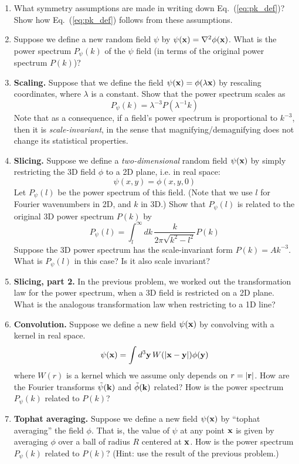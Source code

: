 \documentclass[aps,prd,superscriptaddress,groupedaddress,nofootinbib,nobibnotes]{revtex4}
\newcommand{\be}{\begin{equation}}
\newcommand{\ee}{\end{equation}}
\def\x{{\bf x}}
\def\y{{\bf y}}
\def\r{{\bf r}}
\def\k{{\bf k}}
\begin{document}
\begin{enumerate}

\item What symmetry assumptions are made in writing down Eq.~(\ref{eq:pk_def})?
 Show how Eq.~(\ref{eq:pk_def}) follows from these assumptions.

\item Suppose we define a new random field $\psi$ by $\psi(\x) = \nabla^2 \phi(\x)$.
What is the power spectrum $P_\psi(k)$ of the $\psi$ field (in terms of the original power spectrum $P(k)$)?

\item {\bf Scaling.}
Suppose that we define the field $\psi(\x) = \phi(\lambda\x)$ by rescaling coordinates,
where $\lambda$ is a constant.  Show that the power spectrum scales as
\be
P_\psi(k) = \lambda^{-3} P(\lambda^{-1} k)
\ee
Note that as a consequence, if a field's power spectrum is proportional to $k^{-3}$, 
then it is {\em scale-invariant}, in the sense that magnifying/demagnifying does 
not change its statistical properties.

\item {\bf Slicing.}
Suppose we define a {\em two-dimensional} random field $\psi(\x)$ by simply restricting 
the 3D field $\phi$ to a 2D plane, i.e. in real space:
\be
\psi(x,y) = \phi(x,y,0)
\ee
Let $P_\psi(l)$ be the power spectrum of this field.  (Note that we use $l$ for Fourier wavenumbers in 2D, and
$k$ in 3D.)  Show that $P_\psi(l)$ is related to the original 3D power spectrum $P(k)$ by
\be
P_\psi(l) = \int_l^\infty dk \, \frac{k}{2\pi\sqrt{k^2-l^2}} P(k)
\ee
Suppose the 3D power spectrum has the scale-invariant form $P(k) = A k^{-3}$.
What is $P_\psi(l)$ in this case?  Is it also scale invariant?

\item {\bf Slicing, part 2.}
In the previous problem, we worked out the transformation law for the power spectrum,
when a 3D field is restricted on a 2D plane.  What is the analogous transformation law
when restricting to a 1D line?

\item {\bf Convolution.}
Suppose we define a new field $\psi(\x)$ by convolving with a kernel in real space.
\be
\psi(\x) = \int d^3\y \, W(|\x-\y|) \phi(\y)
\ee
where $W(r)$ is a kernel which we assume only depends on $r = |\r|$.  How are the Fourier transforms $\tilde\psi(\k)$
and $\tilde\phi(\k)$ related?  How is the power spectrum $P_\psi(k)$ related to $P(k)$?

\item {\bf Tophat averaging.}
Suppose we define a new field $\psi(\x)$ by ``tophat averaging'' the field $\phi$.
That is, the value of $\psi$ at any point $\x$ is given by averaging $\phi$ over a ball of radius $R$ centered at $\x$.
How is the power spectrum $P_\psi(k)$ related to $P(k)$?  (Hint: use the result of the previous problem.)

\end{enumerate}
\end{document}
